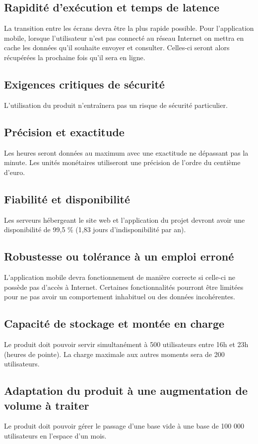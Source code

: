 \subsection{Rapidité d'exécution et temps de latence}
La transition entre les écrans devra être la plus rapide possible. Pour l'application mobile, lorsque l'utilisateur n'est pas connecté au réseau Internet on mettra en cache les données qu'il souhaite envoyer et consulter. Celles-ci seront alors récupérées la prochaine fois qu'il sera en ligne.

\subsection{Exigences critiques de sécurité}
L'utilisation du produit n’entraînera pas un risque de sécurité particulier.

\subsection{Précision et exactitude}
Les heures seront données au maximum avec une exactitude ne dépassant pas la minute. Les unités monétaires utiliseront une précision de l'ordre du centième d'euro.

\subsection{Fiabilité et disponibilité}
Les serveurs hébergeant le site web et l'application du projet devront avoir une disponibilité de 99,5 \% (1,83 jours d'indisponibilité par an).

\subsection{Robustesse ou tolérance à un emploi erroné}
L'application mobile devra fonctionnement de manière correcte si celle-ci ne possède pas d'accès à Internet. Certaines fonctionnalités pourront être limitées pour ne pas avoir un comportement inhabituel ou des données incohérentes.

\subsection{Capacité de stockage et montée en charge}
Le produit doit pouvoir servir simultanément à 500 utilisateurs entre 16h et 23h (heures de pointe). La charge maximale aux autres moments sera de 200 utilisateurs.

\subsection{Adaptation du produit à une augmentation de volume à traiter}
Le produit doit pouvoir gérer le passage d'une base vide à une base de 100 000 utilisateurs en l'espace d'un mois.


